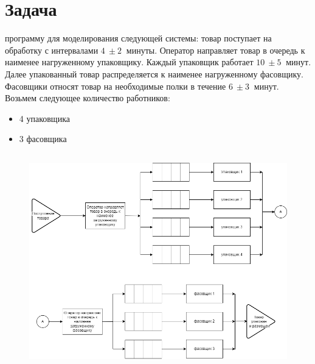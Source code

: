 \documentclass[16pt]{report}
\begin{document}
\chapter*{Задача}
{ программу для моделирования следующей системы: товар поступает на обработку с интервалами $\SI{4}{} \pm \SI{2}{}$ минуты. Оператор направляет товар в очередь к наименее нагруженному упаковщику. Каждый упаковщик работает $\SI{10}{} \pm \SI{5}{}$ минут. Далее упакованный товар распределяется к наименее нагруженному фасовщику. Фасовщики относят товар на необходимые полки в течение  $\SI{6}{} \pm \SI{3}{}$ минут.\\ 


Возьмем следующее количество работников:

\begin{itemize}
  \item 4 упаковщика
  \item 3 фасовщика 
\end{itemize}

\section*{}
\begin{figure}[h]
	\centering
	\includegraphics[scale=0.4]{diag-Page-1.drawio.png}
	\label{fig:screenshot001}
\end{figure}
} 



\newpage
\end{document}
